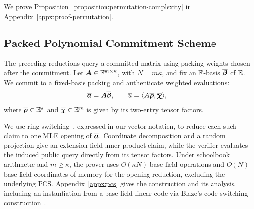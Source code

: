 We prove Proposition~\ref{proposition:permutation-complexity} in
Appendix~\ref{appx:proof-permutation}.

\subsection{Packed Polynomial Commitment Scheme}
\label{sec:pcs}

The preceding reductions query a committed matrix using packing
weights chosen after the commitment.
Let \(\bm A\in{\mathbb{F}}^{m\times\kappa}\), with \(N=m\kappa\),
and fix an \({\mathbb{F}}\)-basis \(\overline{\bm\beta}\) of
\(\mathbb{E}\).
We commit to a fixed-basis packing and authenticate weighted
evaluations:
\[
    \overline{\bm a}=\bm A\overline{\bm\beta},
    \qquad
    \overline{u}=\langle\bm A\overline{\bm\rho},\overline{\bm\chi}\rangle,
\]
where \(\overline{\bm\rho}\in\mathbb{E}^\kappa\) and
\(\overline{\bm\chi}\in\mathbb{E}^m\) is given by its two-entry
tensor factors.

We use ring-switching~\cite{eurocrypt/DiamondP26}, expressed in
our vector notation, to reduce each such claim to one MLE opening
of \(\overline{\bm a}\).
Coordinate decomposition and a random projection give an
extension-field inner-product claim, while the verifier evaluates
the induced public query directly from its tensor factors.
Under schoolbook arithmetic and \(m\geq\kappa\), the prover uses
\(O(\kappa N)\) base-field operations and \(O(N)\) base-field
coordinates of memory for the opening reduction, excluding the
underlying PCS.
Appendix~\ref{appx:pcs} gives the construction and its analysis,
including an instantiation from a base-field linear code via
Blaze's code-switching construction~\cite{eurocrypt/BrehmCFRRZ25}.
